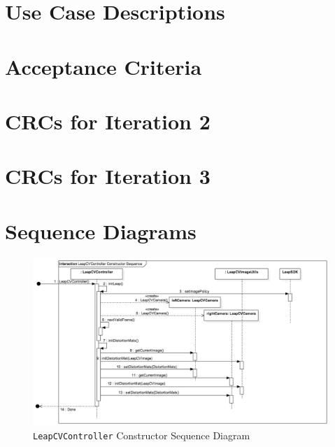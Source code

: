 \documentclass[11pt,oneside]{report}
\newcommand\code[1]{\texttt{#1}}
\begin{document}
	\clearpage
	
	
	\begin{appendices}
	\chapter{Use Case Descriptions} \label{app:use_case_descriptions}
			
			
			
			
			
			
			
			
			
			
	\chapter{Acceptance Criteria} \label{app:acc_crit}
			
	\chapter{CRCs for Iteration 2} \label{app:crc_it_1}
			
			
			
			
			
	\chapter{CRCs for Iteration 3} \label{app:crc_it_2}
			
			
			
			
			
			
			
	\chapter{Sequence Diagrams}
			\begin{figure}
			\centering
    				\includegraphics[width=\textheight, angle=90]{seq_LeapCVController}
    			\caption{\code{LeapCVController} Constructor Sequence Diagram \protect {\label{fig:seq_LeapCVController}}}
			\end{figure}	
			

\end{appendices}
\end{document}
